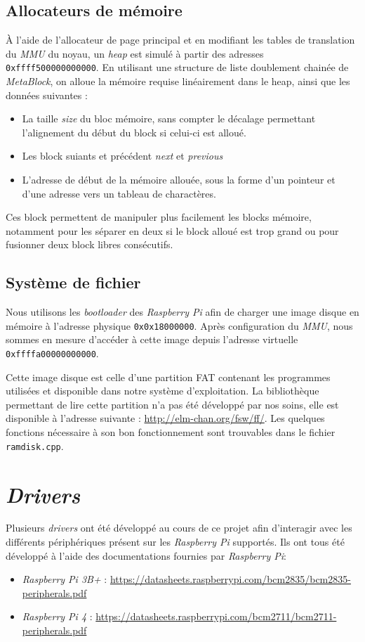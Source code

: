 \documentclass[french, 12pt]{article}
\newcommand{\rpi}{\emph{Raspberry Pi}}
\begin{document}
\subsection{Allocateurs de mémoire}
À l'aide de l'allocateur de page principal et en modifiant les tables de
translation du \textit{MMU} du noyau, un \textit{heap} est simulé à partir des
adresses \texttt{0xffff500000000000}.
En utilisant une structure de liste doublement chainée de \textit{MetaBlock}, on alloue la mémoire requise 
linéairement dans le heap, ainsi que les données suivantes :
\begin{itemize}
    \item La taille \textit{size} du bloc mémoire, sans compter le décalage permettant l'alignement 
    du début du block si celui-ci est alloué.
    \item Les block suiants et précédent \textit{next} et \textit{previous}
    \item L'adresse de début de la mémoire allouée, sous la forme d'un pointeur et d'une adresse vers un tableau 
    de charactères.
\end{itemize}

Ces block permettent de manipuler plus facilement les blocks mémoire, notamment pour les séparer en deux si le 
block alloué est trop grand ou pour fusionner deux block libres consécutifs.

\subsection{Système de fichier}
Nous utilisons les \textit{bootloader} des \rpi{} afin de charger une
image disque en mémoire à l'adresse physique \texttt{0x0x18000000}. Après
configuration du \textit{MMU}, nous sommes en mesure d'accéder à cette image
depuis l'adresse virtuelle \texttt{0xffffa00000000000}.

Cette image disque est celle d'une partition FAT contenant les programmes
utilisées et disponible dans notre système d'exploitation. La bibliothèque
permettant de lire cette partition n'a pas été développé par nos soins, elle est
disponible à l'adresse suivante : \url{http://elm-chan.org/fsw/ff/}. Les
quelques fonctions nécessaire à son bon fonctionnement sont trouvables dans le
fichier \texttt{ramdisk.cpp}.

\section{\textit{Drivers}}
Plusieurs \textit{drivers} ont été développé au cours de ce projet afin
d'interagir avec les différents périphériques présent sur les \rpi{} supportés.
Ils ont tous été développé à l'aide des documentations fournies par \rpi{}:
\begin{itemize}
    \item \emph{Raspberry Pi 3B+} : \url{https://datasheets.raspberrypi.com/bcm2835/bcm2835-peripherals.pdf}
    \item \emph{Raspberry Pi 4} : \url{https://datasheets.raspberrypi.com/bcm2711/bcm2711-peripherals.pdf}
\end{itemize}
\end{document}
